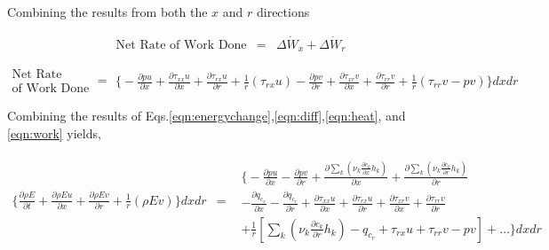 	Combining the results from both the $x$ and $r$ directions

\begin{displaymath}
	\begin{array}{ccc}
		\textrm{Net Rate of Work Done} & = & \Delta \dot{W}_x + \Delta \dot{W}_r 
	\end{array}
\end{displaymath}

\begin{equation}
	\begin{array}{c}
	\textrm{Net Rate}\\ \textrm{of Work Done}
	\end{array} =  
			\begin{array}{c} 
		\Big\{-\frac{\partial pu}{\partial x}  
		+ \frac{\partial \tau_{xx}u}{\partial x}
		+ \frac{\partial \tau_{rx}u}{\partial r} + \frac{1}{r}(\tau_{rx}u) -\frac{\partial pv}{\partial r}
		+ \frac{\partial \tau_{xr}v}{\partial x} + \frac{\partial \tau_{rr}v}{\partial r} 
		+ \frac{1}{r}(\tau_{rr}v -pv)\Big\}dxdr 
			\end{array}	
\label{eqn:work}
\end{equation}

	Combining the results of Eqs.\ref{eqn:energychange},\ref{eqn:diff},\ref{eqn:heat}, and \ref{eqn:work} yields,

\begin{displaymath}
	\begin{array}{ccc}
		\Big\{\frac{\partial \rho E}{\partial t} +\frac{\partial \rho E u}{\partial x} + \frac{\partial \rho E v}
		{\partial r} + \frac{1}{r}(\rho E v)\Big\}dxdr & = &
		\begin{array}{c}
			\Big\{-\frac{\partial pu}{\partial x} -\frac{\partial pv}{\partial r}
			+\frac{\partial \sum_k (\nu_k \frac{\partial c_k}{\partial x}h_k)}{\partial x} 
			+ \frac{\partial \sum_k (\nu_k \frac{\partial c_k}{\partial r}h_k)}{\partial r}
			 \\
			-\frac{\partial q_{c_x}}{\partial x} - \frac{\partial q_{c_r}}{\partial r}
			+ \frac{\partial \tau_{xx}u}{\partial x} + \frac{\partial \tau_{rx}u}{\partial r} 
			+ \frac{\partial \tau_{xr}v}{\partial x} + \frac{\partial \tau_{rr}v}{\partial r} \\
			+\frac{1}{r}[\sum_k (\nu_k \frac{\partial c_k}{\partial r}h_k) - q_{c_r} + \tau_{rx}u 
			+ \tau_{rr}v - pv] + \ldots \Big\}dxdr	
		\end{array}  
	\end{array}	
\end{displaymath}


